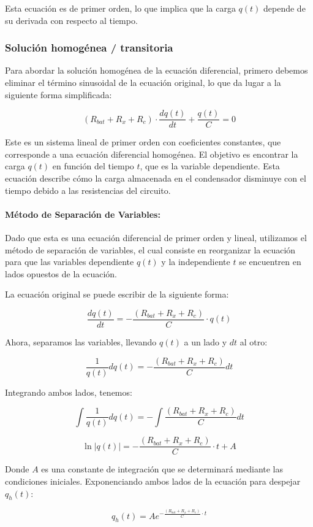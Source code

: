 Esta ecuación es de primer orden, lo que implica que la carga \(q(t)\) depende de su derivada
con respecto al tiempo.

\subsubsection*{Solución homogénea / transitoria}
Para abordar la solución homogénea de la ecuación diferencial, primero debemos eliminar el
término sinusoidal de la ecuación original, lo que da lugar a la siguiente forma simplificada:

\[
	(R_{bat} + R_x + R_c) \cdot \frac{dq(t)}{dt} + \frac{q(t)}{C} = 0
\]

Este es un sistema lineal de primer orden con coeficientes constantes, que corresponde a una
ecuación diferencial homogénea. El objetivo es encontrar la carga \(q(t)\) en función del tiempo
\(t\), que es la variable dependiente. Esta ecuación describe cómo la carga almacenada en el
condensador disminuye con el tiempo debido a las resistencias del circuito.

\paragraph*{Método de Separación de Variables:}
Dado que esta es una ecuación diferencial de primer orden y lineal, utilizamos el
método de separación de variables, el cual consiste en reorganizar la ecuación para
que las variables dependiente \(q(t)\) y la independiente \(t\) se encuentren en lados
opuestos de la ecuación.

La ecuación original se puede escribir de la siguiente forma:

\[
	\frac{dq(t)}{dt} = -\frac{(R_{bat} + R_x + R_c)}{C} \cdot q(t)
\]

Ahora, separamos las variables, llevando \(q(t)\) a un lado y \(dt\) al otro:

\[
	\frac{1}{q(t)} dq(t) = -\frac{(R_{bat} + R_x + R_c)}{C} dt
\]

Integrando ambos lados, tenemos:

\[
	\int \frac{1}{q(t)} dq(t) = -\int \frac{(R_{bat} + R_x + R_c)}{C} dt
\]

\[
	\ln |q(t)| = -\frac{(R_{bat} + R_x + R_c)}{C} \cdot t  + A
\]

Donde \(A\) es una constante de integración que se determinará mediante las condiciones
iniciales. Exponenciando ambos lados de la ecuación para despejar \(q_h(t)\):

\[
	q_h(t) = Ae^{-\frac{(R_{bat} + R_x + R_c)}{C} \cdot t}
\]

